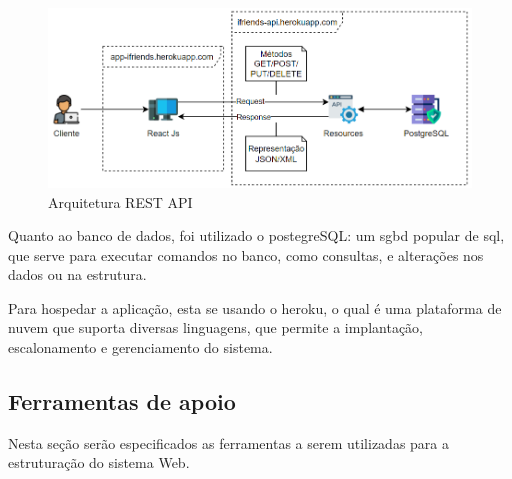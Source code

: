 \begin{figure}[htb]
\centering
\caption{Arquitetura REST API}
\label{Arquitetura_Rest_API}
\includegraphics[width=1.0\textwidth]{anexos/Imagens_Diagramas/Arquitetura-Rest-API.png}
\end{figure}
\FloatBarrier

Quanto ao banco de dados, foi utilizado o \gls{postegreSQL}: um \acs{sgbd} popular de \acs{sql}, que serve para executar comandos no banco, como consultas, e alterações nos dados ou na estrutura.

Para hospedar a aplicação, esta se usando o \gls{heroku}, o qual é uma plataforma de nuvem que suporta diversas linguagens, que permite a implantação, escalonamento e gerenciamento do sistema.

\subsection{Ferramentas de apoio}
Nesta seção serão especificados as ferramentas a serem utilizadas para a estruturação do sistema  Web.

